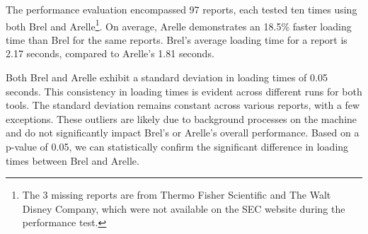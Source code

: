 The performance evaluation encompassed 97 reports, each tested ten times using both Brel and Arelle\footnote{The 3 missing reports are from Thermo Fisher Scientific and The Walt Disney Company, which were not available on the SEC website during the performance test.}.
On average, Arelle demonstrates an 18.5\% faster loading time than Brel for the same reports.
Brel's average loading time for a report is 2.17 seconds, compared to Arelle's 1.81 seconds.

Both Brel and Arelle exhibit a standard deviation in loading times of 0.05 seconds.
This consistency in loading times is evident across different runs for both tools.
The standard deviation remains constant across various reports, with a few exceptions.
These outliers are likely due to background processes on the machine and do not significantly impact Brel's or Arelle's overall performance.
Based on a p-value of 0.05, we can statistically confirm the significant difference in loading times between Brel and Arelle.




